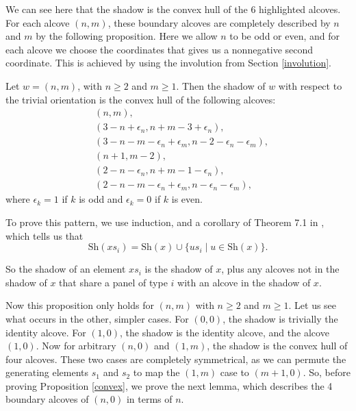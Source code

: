 \documentclass[11pt]{article}
\begin{document}
We can see here that the shadow is the convex hull of the 6 highlighted alcoves. For each alcove $(n,m)$, these boundary alcoves are completely described by $n$ and $m$ by the following proposition. Here we allow $n$ to be odd or even, and for each alcove we choose the coordinates that gives us a nonnegative second coordinate. This is achieved by using the involution from Section \ref{involution}. 
\begin{proposition}\label{convex}
    Let $w=(n,m)$, with $n\geq 2$ and $m\geq 1$. Then the shadow of $w$ with respect to the trivial orientation is the convex hull of the following alcoves:
    \begin{align*}
    &(n,m),\\
    &(3-n+\epsilon_n,n+m-3+\epsilon_n),\\
    &(3-n-m-\epsilon_n+\epsilon_m,n-2-\epsilon_n-\epsilon_m),\\
    &(n+1,m-2),\\
    &(2-n-\epsilon_n,n+m-1-\epsilon_n),\\
    &(2-n-m-\epsilon_n+\epsilon_m,n-\epsilon_n-\epsilon_m),
    \end{align*}
    where $\epsilon_k=1$ if $k$ is odd and $\epsilon_k=0$ if $k$ is even.
\end{proposition}



To prove this pattern, we use induction, and a corollary of Theorem 7.1 in \cite{SHA}, which tells us that
\begin{equation}\tag{$\star$}
    \text{Sh}(xs_i)=\text{Sh}(x)\cup \{us_i\mid u\in \text{Sh}(x)\}.
\end{equation}

So the shadow of an element $xs_i$ is the shadow of $x$, plus any alcoves not in the shadow of $x$ that share a panel of type $i$ with an alcove in the shadow of $x$. 

Now this proposition only holds for $(n,m)$ with $n\geq 2$ and $m\geq 1$. Let us see what occurs in the other, simpler cases. For $(0,0)$, the shadow is trivially the identity alcove. For $(1,0)$, the shadow is the identity alcove, and the alcove $(1,0)$. Now for arbitrary $(n,0)$ and $(1,m)$, the shadow is the convex hull of four alcoves. These two cases are completely symmetrical, as we can permute the generating elements $s_1$ and $s_2$ to map the $(1,m)$ case to $(m+1,0)$. So, before proving Proposition \ref{convex},  we prove the next lemma, which describes the 4 boundary alcoves of $(n,0)$ in terms of $n$. 
\end{document}
